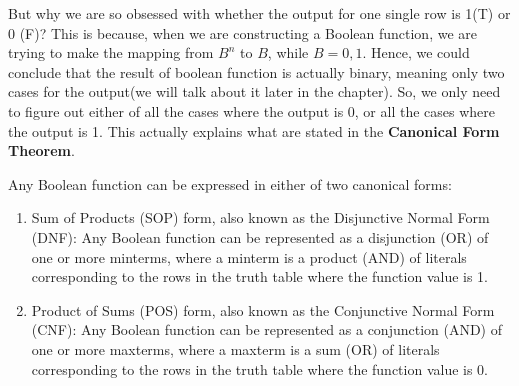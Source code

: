     But why we are so obsessed with whether the output for one single row is 1(T) or 0 (F)?
    This is because, when we are constructing a Boolean function, we are trying to make the mapping
    from $B^n$ to $B$, while $B = {0,1}$. Hence, we could conclude that the result of boolean function
    is actually binary, meaning only two cases for the output(we will talk about it later in the chapter).   
    So, we only need to figure out either of all the cases where the output is 0, or all the cases where the 
    output  is 1. This actually explains what are stated in the \textbf{Canonical Form Theorem}.
    \begin{theorem}
        Any Boolean function can be expressed in either of two canonical forms:
        \begin{enumerate}
        \item Sum of Products (SOP) form, also known as the Disjunctive Normal Form (DNF): Any Boolean function can be represented as a disjunction (OR) of one or more minterms, where a minterm is a product (AND) of literals corresponding to the rows in the truth table where the function value is 1.
        \item Product of Sums (POS) form, also known as the Conjunctive Normal Form (CNF): Any Boolean function can be represented as a conjunction (AND) of one or more maxterms, where a maxterm is a sum (OR) of literals corresponding to the rows in the truth table where the function value is 0.
        \end{enumerate}
        \end{theorem}
        
